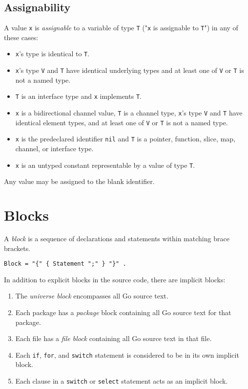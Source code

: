 \subsection*{Assignability}

A value \texttt{x} is \emph{assignable} to a variable of type \texttt{T}
("\texttt{x} is assignable to \texttt{T}") in any of these cases:

\begin{itemize}
\item
  \texttt{x}'s type is identical to \texttt{T}.
\item
  \texttt{x}'s type \texttt{V} and \texttt{T} have identical
  underlying types and at least one of \texttt{V} or
  \texttt{T} is not a named type.
\item
  \texttt{T} is an interface type and \texttt{x}
  implements \texttt{T}.
\item
  \texttt{x} is a bidirectional channel value, \texttt{T} is a channel
  type, \texttt{x}'s type \texttt{V} and \texttt{T} have identical
  element types, and at least one of \texttt{V} or \texttt{T} is not a
  named type.
\item
  \texttt{x} is the predeclared identifier \texttt{nil} and \texttt{T}
  is a pointer, function, slice, map, channel, or interface type.
\item
  \texttt{x} is an untyped constant representable
  by a value of type \texttt{T}.
\end{itemize}

Any value may be assigned to the blank identifier.

\section*{Blocks}

A \emph{block} is a sequence of declarations and statements within
matching brace brackets.

\begin{Verbatim}[frame=single]
Block = "{" { Statement ";" } "}" .
\end{Verbatim}

In addition to explicit blocks in the source code, there are implicit
blocks:

\begin{enumerate}
\item
  The \emph{universe block} encompasses all Go source text.
\item
  Each package has a \emph{package} block
  containing all Go source text for that package.
\item
  Each file has a \emph{file block} containing all Go source text in
  that file.
\item
  Each \texttt{if}, \texttt{for}, and \texttt{switch} statement is
  considered to be in its own implicit block.
\item
  Each clause in a \texttt{switch} or \texttt{select} statement acts as
  an implicit block.
\end{enumerate}

